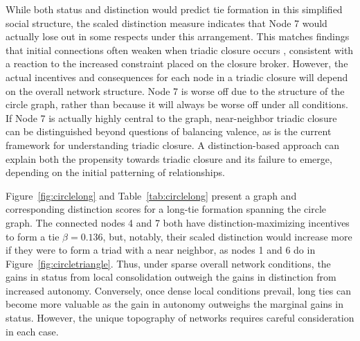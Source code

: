 \documentclass[12pt]{article}
\begin{document}
While both status and distinction would predict tie formation in this simplified social structure, the scaled distinction measure indicates that Node 7 would actually lose out in some respects under this arrangement. This matches findings that initial connections often weaken when triadic closure occurs \citep{huang2018will}, consistent with a reaction to the increased constraint placed on the closure broker. However, the actual incentives and consequences for each node in a triadic closure will depend on the overall network structure. Node 7 is worse off due to the structure of the circle graph, rather than because it will always be worse off under all conditions. If Node 7 is actually highly central to the graph, near-neighbor triadic closure can be distinguished beyond questions of balancing valence, as is the current framework for understanding triadic closure. A distinction-based approach can explain both the propensity towards triadic closure and its failure to emerge, depending on the initial patterning of relationships. 




Figure~\ref{fig:circlelong} and Table~\ref{tab:circlelong} present a graph and corresponding distinction scores for a long-tie formation spanning the circle graph. The connected nodes 4 and 7 both have distinction-maximizing incentives to form a tie $\beta = 0.136$, but, notably, their scaled distinction would increase more if they were to form a triad with a near neighbor, as nodes 1 and 6 do in Figure~\ref{fig:circletriangle}. Thus, under sparse overall network conditions, the gains in status from local consolidation outweigh the gains in distinction from increased autonomy. Conversely, once dense local conditions prevail, long ties can become more valuable as the gain in autonomy outweighs the marginal gains in status. However, the unique topography of networks requires careful consideration in each case.
\end{document}

